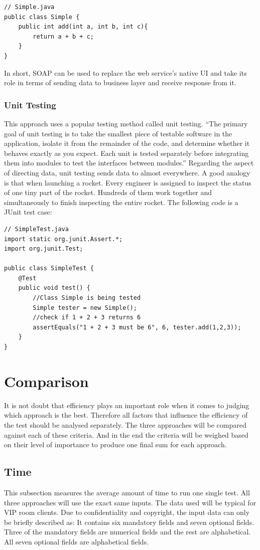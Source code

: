 \documentclass[12pt]{article}
\begin{document}
\begin{lstlisting}
// Simple.java
public class Simple {
	public int add(int a, int b, int c){
		return a + b + c;
	}
}

\end{lstlisting}

In short, SOAP can be used to replace the web service's native UI and take its role in terms of sending data to business layer and receive response from it.

\subsubsection{Unit Testing}
This approach uses a popular testing method called unit testing. “The primary goal of unit testing is to take the smallest piece of testable software in the application, isolate it from the remainder of the code, and determine whether it behaves exactly as you expect. Each unit is tested separately before integrating them into modules to test the interfaces between modules.”\cite{unit} Regarding the aspect of directing data, unit testing sends data to almost everywhere. A good analogy is that when launching a rocket. Every engineer is assigned to inspect the status of one tiny part of the rocket. Hundreds of them work together and simultaneously to finish inspecting the entire rocket. The following code is a JUnit test case:\\
\begin{lstlisting}
// SimpleTest.java
import static org.junit.Assert.*;
import org.junit.Test;

public class SimpleTest {
	@Test
	public void test() {
		//Class Simple is being tested
		Simple tester = new Simple();
		//check if 1 + 2 + 3 returns 6
		assertEquals("1 + 2 + 3 must be 6", 6, tester.add(1,2,3));
	}
}
\end{lstlisting}
\newpage

\section{Comparison}
It is not doubt that efficiency plays an important role when it comes to judging which approach is the best. Therefore all factors that influence the efficiency of the test should be analysed separately.  The three approaches will be compared against each of these criteria. And in the end the criteria will be weighed based on their level of importance to produce one final sum for each approach.\\
\subsection{Time}
This subsection measures the average amount of time to run one single test. All three approaches will use the exact same inputs. The data used will be typical for VIP room clients. Due to confidentiality and copyright, the input data can only be briefly described as:  It contains six mandatory fields and seven optional fields. Three of the mandatory fields are numerical fields and the rest are alphabetical. All seven optional fields are alphabetical fields.\\
\end{document}
